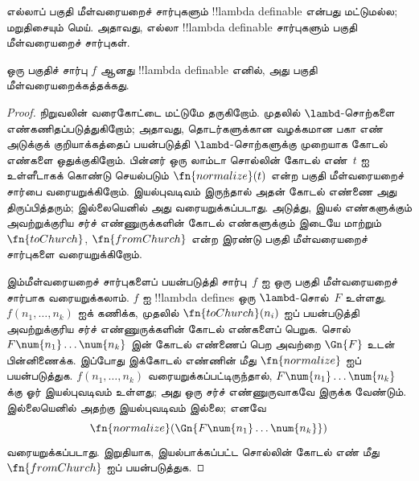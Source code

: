 \documentclass[../../../include/open-logic-section]{subfiles}
\begin{document}

எல்லாப் பகுதி மீள்வரையறைச் சார்புகளும் !!{lambda definable} என்பது
மட்டுமல்ல; மறுதிசையும் மெய். அதாவது, எல்லா !!{lambda definable}
சார்புகளும் பகுதி மீள்வரையறைச் சார்புகள்.

\begin{thm}
   ஒரு பகுதிச் சார்பு $f$ ஆனது
  !!{lambda definable} எனில், அது பகுதி மீள்வரையறைக்கத்தக்கது.
\end{thm}

\begin{proof}
  நிறுவலின் வரைகோட்டை மட்டுமே தருகிறோம்.
  முதலில் $\lambd$-சொற்களை எண்கணிதப்படுத்துகிறோம்; அதாவது, தொடர்களுக்கான
  வழக்கமான பகா எண் அடுக்குக் குறியாக்கத்தைப் பயன்படுத்தி
  $\lambd$-சொற்களுக்கு முறையாக கோடல் எண்களை ஒதுக்குகிறோம். பின்னர் ஒரு
  லாம்டா சொல்லின் கோடல் எண்~$t$ ஐ உள்ளீடாகக் கொண்டு செயல்படும்
  $\fn{normalize}(t)$ என்ற பகுதி மீள்வரையறைச் சார்பை வரையறுக்கிறோம்.
  இயல்புவடிவம் இருந்தால் அதன் கோடல் எண்ணை அது திருப்பித்தரும்; இல்லையெனில்
  அது வரையறுக்கப்படாது. அடுத்து, இயல் எண்களுக்கும் அவற்றுக்குரிய சர்ச்
  எண்ணுருக்களின் கோடல் எண்களுக்கும் இடையே மாற்றும் $\fn{toChurch}$,
  $\fn{fromChurch}$ என்ற இரண்டு பகுதி மீள்வரையறைச் சார்புகளை
  வரையறுக்கிறோம்.

  இம்மீள்வரையறைச் சார்புகளைப் பயன்படுத்தி சார்பு~$f$ ஐ ஒரு பகுதி
  மீள்வரையறைச் சார்பாக வரையறுக்கலாம். $f$ ஐ !!{lambda define}s ஒரு
  $\lambd$-சொல்~$F$ உள்ளது. $f(n_1, \dots, n_k)$ ஐக் கணிக்க, முதலில்
  $\fn{toChurch}(n_i)$ ஐப் பயன்படுத்தி அவற்றுக்குரிய சர்ச் எண்ணுருக்களின்
  கோடல் எண்களைப் பெறுக. சொல் $F \num{n_1}\dots\num{n_k}$ இன் கோடல்
  எண்ணைப் பெற அவற்றை $\Gn{F}$ உடன் பின்னிணைக்க. இப்போது இக்கோடல் எண்ணின்
  மீது $\fn{normalize}$ ஐப் பயன்படுத்துக.
  $f(n_1, \dots, n_k)$ வரையறுக்கப்பட்டிருந்தால்,
  $F \num{n_1}\dots\num{n_k}$ க்கு ஓர் இயல்புவடிவம் உள்ளது; அது ஒரு
  சர்ச் எண்ணுருவாகவே இருக்க வேண்டும். இல்லையெனில் அதற்கு இயல்புவடிவம் இல்லை;
  எனவே
  \[\fn{normalize}(\Gn{F\num{n_1}\dots\num{n_k}})\]
  வரையறுக்கப்படாது. இறுதியாக, இயல்பாக்கப்பட்ட சொல்லின் கோடல் எண் மீது
  $\fn{fromChurch}$ ஐப் பயன்படுத்துக.
\end{proof}
\end{document}
